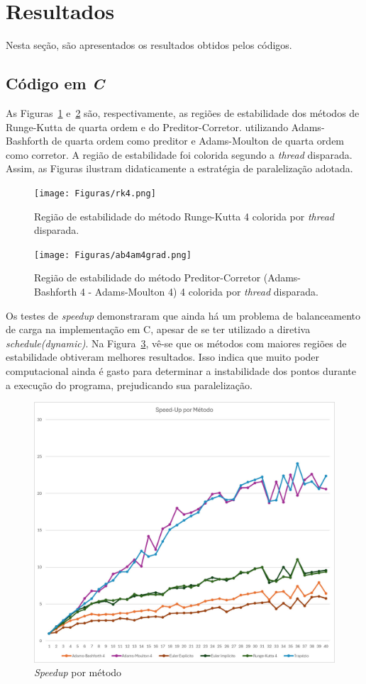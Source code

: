 \documentclass[a4paper,12pt]{article}
\begin{document}
\section{Resultados}

Nesta seção, são apresentados os resultados obtidos pelos códigos.

\subsection{Código em \textit{C}}

As Figuras~\ref{fig:rk4} e~\ref{fig:abam4} são,
respectivamente,
as regiões de estabilidade dos métodos de Runge-Kutta de quarta ordem e do Preditor-Corretor. utilizando Adams-Bashforth de quarta ordem como preditor e Adams-Moulton de quarta ordem como corretor. 
A região de estabilidade foi colorida segundo a \textit{thread} disparada. Assim, as Figuras ilustram didaticamente a estratégia de paralelização adotada.

\begin{figure}[H]
    \centering
    \texttt{[image: Figuras/rk4.png]}
    \caption{Região de estabilidade do método Runge-Kutta 4 colorida por \textit{thread} disparada.}
    \label{fig:rk4}
\end{figure}

\begin{figure}[H]
    \centering
    \texttt{[image: Figuras/ab4am4grad.png]}
    \caption{Região de estabilidade do método Preditor-Corretor (Adams-Bashforth 4 - Adams-Moulton 4) 4 colorida por \textit{thread} disparada.}
    \label{fig:abam4}
\end{figure}

Os testes de \textit{speedup} demonstraram que ainda há
um problema de balanceamento de carga na implementação em C, apesar de se ter utilizado a diretiva \textit{schedule(dynamic)}. Na Figura~\ref{fig:speedupc},
vê-se que os métodos com maiores regiões de estabilidade
obtiveram melhores resultados. 
Isso indica que muito poder computacional ainda é gasto para determinar a instabilidade dos pontos durante a execução do programa, prejudicando sua paralelização.

\begin{figure}[H]
    \centering
    \includegraphics[width=0.7
    \linewidth]{Figuras/speedupc.jpeg}
    \caption{\textit{Speedup} por método}
    \label{fig:speedupc}
\end{figure}



\newpage

\nocite{FABRICIO_ROBERTO_2025_MEC_FLU}
\end{document}
